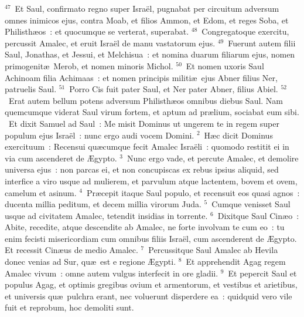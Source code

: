 ${}^{47}$~Et Saul, confirmato regno super Isra\"el, pugnabat per circuitum adversum omnes inimicos ejus, contra Moab, et filios Ammon, et Edom, et reges Soba, et Philisth\ae os~: et quocumque se verterat, superabat.
${}^{48}$~Congregatoque exercitu, percussit Amalec, et eruit Isra\"el de manu vastatorum ejus.
${}^{49}$~Fuerunt autem filii Saul, Jonathas, et Jessui, et Melchisua~: et nomina duarum filiarum ejus, nomen primogenit\ae\ Merob, et nomen minoris Michol.
${}^{50}$~Et nomen uxoris Saul Achinoam filia Achimaas~: et nomen principis militi\ae\ ejus Abner filius Ner, patruelis Saul.
${}^{51}$~Porro Cis fuit pater Saul, et Ner pater Abner, filius Abiel.
${}^{52}$~Erat autem bellum potens adversum Philisth\ae os omnibus diebus Saul. Nam quemcumque viderat Saul virum fortem, et aptum ad pr\ae lium, sociabat eum sibi.
~\lettrine[lines=10,image=true,loversize=0.05,lraise=-0.03]{E}{}t dixit Samuel ad Saul~: Me misit Dominus ut ungerem te in regem super populum ejus Isra\"el~: nunc ergo audi vocem Domini.
${}^{2}$~H\ae c dicit Dominus exercituum~: Recensui qu\ae cumque fecit Amalec Isra\"eli~: quomodo restitit ei in via cum ascenderet de \AE gypto.
${}^{3}$~Nunc ergo vade, et percute Amalec, et demolire universa ejus~: non parcas ei, et non concupiscas ex rebus ipsius aliquid, sed interfice a viro usque ad mulierem, et parvulum atque lactentem, bovem et ovem, camelum et asinum.
${}^{4}$~Pr\ae cepit itaque Saul populo, et recensuit eos quasi agnos~: ducenta millia peditum, et decem millia virorum Juda.
${}^{5}$~Cumque venisset Saul usque ad civitatem Amalec, tetendit insidias in torrente.
${}^{6}$~Dixitque Saul Cin\ae o~: Abite, recedite, atque descendite ab Amalec, ne forte involvam te cum eo~: tu enim fecisti misericordiam cum omnibus filiis Isra\"el, cum ascenderent de \AE gypto. Et recessit Cin\ae us de medio Amalec.
${}^{7}$~Percussitque Saul Amalec ab Hevila donec venias ad Sur, qu\ae\ est e regione \AE gypti.
${}^{8}$~Et apprehendit Agag regem Amalec vivum~: omne autem vulgus interfecit in ore gladii.
${}^{9}$~Et pepercit Saul et populus Agag, et optimis gregibus ovium et armentorum, et vestibus et arietibus, et universis qu\ae\ pulchra erant, nec voluerunt disperdere ea~: quidquid vero vile fuit et reprobum, hoc demoliti sunt.


